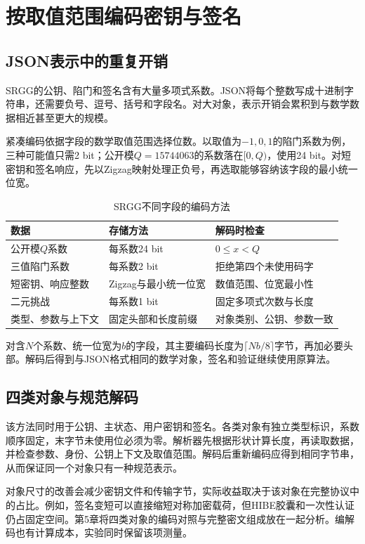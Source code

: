 \section{按取值范围编码密钥与签名}
\subsection{JSON表示中的重复开销}
SRGG的公钥、陷门和签名含有大量多项式系数。JSON将每个整数写成十进制字符串，还需要负号、逗号、括号和字段名。对大对象，表示开销会累积到与数学数据相近甚至更大的规模。

紧凑编码依据字段的数学取值范围选择位数。以取值为$-1,0,1$的陷门系数为例，三种可能值只需2 bit；公开模$Q=15744063$的系数落在$[0,Q)$，使用24 bit。对短密钥和签名响应，先以Zigzag映射处理正负号，再选取能够容纳该字段的最小统一位宽。

\begin{table}[H]
\centering\small
\caption{SRGG不同字段的编码方法}
\label{tab:codec-fields}
\begin{tabularx}{\textwidth}{@{}p{}p{}X@{}}
\toprule
\rowcolor{black!8} 数据 & 存储方法 & 解码时检查 \\
\midrule
公开模$Q$系数 & 每系数24 bit & $0\leq x<Q$ \\
三值陷门系数 & 每系数2 bit & 拒绝第四个未使用码字 \\
短密钥、响应整数 & Zigzag与最小统一位宽 & 数值范围、位宽最小性 \\
二元挑战 & 每系数1 bit & 固定多项式次数与长度 \\
类型、参数与上下文 & 固定头部和长度前缀 & 对象类别、公钥、参数一致 \\
\bottomrule
\end{tabularx}
\end{table}

对含$N$个系数、统一位宽为$b$的字段，其主要编码长度为$\lceil Nb/8\rceil$字节，再加必要头部。解码后得到与JSON格式相同的数学对象，签名和验证继续使用原算法。

\subsection{四类对象与规范解码}
该方法同时用于公钥、主状态、用户密钥和签名。各类对象有独立类型标识，系数顺序固定，末字节未使用位必须为零。解析器先根据形状计算长度，再读取数据，并检查参数、身份、公钥上下文及取值范围。解码后重新编码应得到相同字节串，从而保证同一个对象只有一种规范表示。

对象尺寸的改善会减少密钥文件和传输字节，实际收益取决于该对象在完整协议中的占比。例如，签名变短可以直接缩短对称加密载荷，但HIBE胶囊和一次性认证仍占固定空间。第5章将四类对象的编码对照与完整密文组成放在一起分析。编解码也有计算成本，实验同时保留该项测量。

